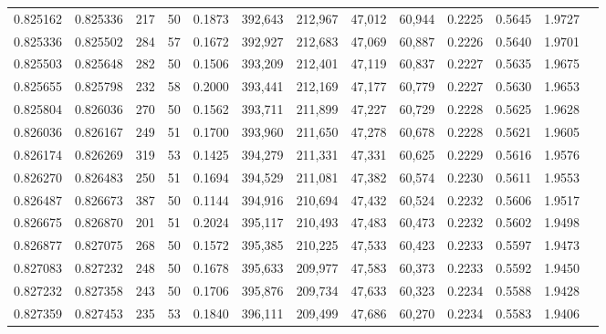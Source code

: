 \begin{tabular}{rrrrrrrrrrrrr}
0.825162 & 0.825336 &   217 &  50 &                                     0.1873 & 392,643 & 212,967 &  47,012 &  60,944 & 0.2225 & 0.5645 & 1.9727 \\
0.825336 & 0.825502 &   284 &  57 &                                     0.1672 & 392,927 & 212,683 &  47,069 &  60,887 & 0.2226 & 0.5640 & 1.9701 \\
0.825503 & 0.825648 &   282 &  50 &                                     0.1506 & 393,209 & 212,401 &  47,119 &  60,837 & 0.2227 & 0.5635 & 1.9675 \\
0.825655 & 0.825798 &   232 &  58 &                                     0.2000 & 393,441 & 212,169 &  47,177 &  60,779 & 0.2227 & 0.5630 & 1.9653 \\
0.825804 & 0.826036 &   270 &  50 &                                     0.1562 & 393,711 & 211,899 &  47,227 &  60,729 & 0.2228 & 0.5625 & 1.9628 \\
0.826036 & 0.826167 &   249 &  51 &                                     0.1700 & 393,960 & 211,650 &  47,278 &  60,678 & 0.2228 & 0.5621 & 1.9605 \\
0.826174 & 0.826269 &   319 &  53 &                                     0.1425 & 394,279 & 211,331 &  47,331 &  60,625 & 0.2229 & 0.5616 & 1.9576 \\
0.826270 & 0.826483 &   250 &  51 &                                     0.1694 & 394,529 & 211,081 &  47,382 &  60,574 & 0.2230 & 0.5611 & 1.9553 \\
0.826487 & 0.826673 &   387 &  50 &                                     0.1144 & 394,916 & 210,694 &  47,432 &  60,524 & 0.2232 & 0.5606 & 1.9517 \\
0.826675 & 0.826870 &   201 &  51 &                                     0.2024 & 395,117 & 210,493 &  47,483 &  60,473 & 0.2232 & 0.5602 & 1.9498 \\
0.826877 & 0.827075 &   268 &  50 &                                     0.1572 & 395,385 & 210,225 &  47,533 &  60,423 & 0.2233 & 0.5597 & 1.9473 \\
0.827083 & 0.827232 &   248 &  50 &                                     0.1678 & 395,633 & 209,977 &  47,583 &  60,373 & 0.2233 & 0.5592 & 1.9450 \\
0.827232 & 0.827358 &   243 &  50 &                                     0.1706 & 395,876 & 209,734 &  47,633 &  60,323 & 0.2234 & 0.5588 & 1.9428 \\
0.827359 & 0.827453 &   235 &  53 &                                     0.1840 & 396,111 & 209,499 &  47,686 &  60,270 & 0.2234 & 0.5583 & 1.9406 \\

\end{tabular}
